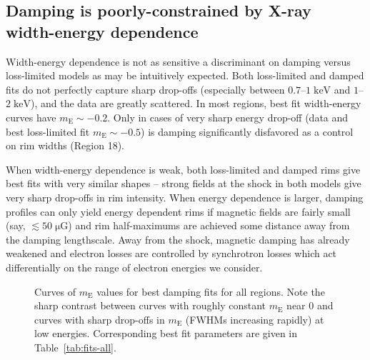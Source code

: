 \documentclass[iop, apj, numberedappendix]{emulateapj}
\newcommand*{\mt}{\mathrm}
\newcommand*{\unit}[1]{\;\mt{#1}}  %
\newcommand*{\mE}{m_\mt{E}}
\newcommand*{\muG}{\unit{\mu G}}
\begin{document}
\subsection{Damping is poorly-constrained by X-ray width-energy dependence}

Width-energy dependence is not as sensitive a discriminant on damping versus
loss-limited models as may be intuitively expected.  Both loss-limited and
damped fits do not perfectly capture sharp drop-offs (especially between
$0.7$--$1 \unit{keV}$ and $1$--$2 \unit{keV}$), and the data are greatly
scattered.  In most regions, best fit width-energy curves have $\mE \sim -0.2$.
Only in cases of very sharp energy drop-off (data and best loss-limited fit
$\mE \sim -0.5$) is damping significantly disfavored as a control on rim widths
(Region 18).

When width-energy dependence is weak, both loss-limited and damped rims give
best fits with very similar shapes -- strong fields at the shock in both models
give very sharp drop-offs in rim intensity.  When energy dependence is larger,
damping profiles can only yield energy dependent rims if magnetic fields are
fairly small (say, $\lesssim 50 \muG$) and rim half-maximums are achieved some
distance away from the damping lengthscale.  Away from the shock, magnetic
damping has already weakened and electron losses are controlled by synchrotron
losses which act differentially on the range of electron energies we consider.

\begin{figure}[h]
    \centering
    \iftoggle{manuscript}{
        \texttt{[image: figures/mE-damp.pdf]}
    }{
        \plotone{figures/mE-damp.pdf}
    }
    \caption{Curves of $\mE$ values for best damping fits for all regions.
        Note the sharp contrast between curves with roughly constant $\mE$ near
        $0$ and curves with sharp drop-offs in $\mE$ (FWHMs increasing rapidly)
        at low energies. Corresponding best fit parameters are given in
        Table~\ref{tab:fits-all}. \label{fig:mE}}
\end{figure}
\end{document}
